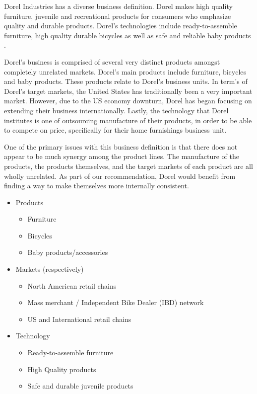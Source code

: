 Dorel Industries has a diverse business definition.   Dorel makes high quality furniture, juvenile and recreational products for consumers who emphasize quality and durable products.  Dorel’s technologies include ready-to-assemble furniture, high quality durable bicycles as well as safe and reliable baby products \cite{DorelIndustries2013}.

Dorel’s business is comprised of several very distinct products amongst completely unrelated markets. Dorel’s main products include furniture, bicycles and baby products.  These products relate to Dorel’s business units.   In term’s of Dorel’s target markets, the United States has traditionally been a very important market. However, due to the US economy downturn, Dorel has began focusing on extending their business internationally.  Lastly, the technology that Dorel institutes is one of outsourcing manufacture of their products, in order to be able to compete on price, specifically for their home furnishings business unit.

One of the primary issues with this business definition is that there does not appear to be much synergy among the product lines. The manufacture of the products, the products themselves, and the target markets of each product are all wholly unrelated. As part of our recommendation, Dorel would benefit from finding a way to make themselves more internally consistent.

\begin{itemize}        	
  \item Products
    \begin{itemize}
      \item Furniture
      \item Bicycles
      \item Baby products/accessories
    \end{itemize}
  \item Markets (respectively)
    \begin{itemize}     
      \item North American retail chains
      \item Mass merchant / Independent Bike Dealer (IBD) network
      \item US and International retail chains
    \end{itemize}
  \item Technology
    \begin{itemize}     
      \item Ready-to-assemble furniture
      \item High Quality products
      \item Safe and durable juvenile products
    \end{itemize}
\end{itemize}


